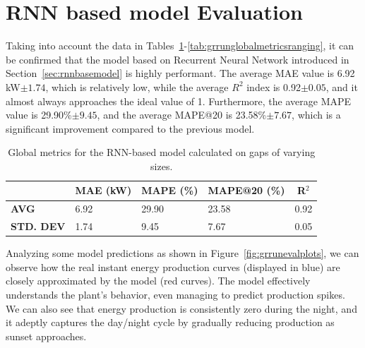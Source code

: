 
\section{RNN based model Evaluation}\label{sec:rnneval}
Taking into account the data in Tables~\ref{tab:grrunglobalmetrics}-\ref{tab:grrunglobalmetricsranging}, it can be confirmed that the model based on
Recurrent Neural Network introduced in Section~\ref{sec:rnnbasemodel} is highly performant.
The average MAE value is 6.92 kW$\pm 1.74$, which is relatively low, while the average $R^2$ index is 0.92$\pm 0.05$, and it almost always approaches the ideal value of 1. Furthermore, the average MAPE value is 29.90\%$\pm 9.45$, and the average MAPE@20 is 23.58\%$\pm7.67$, which is a significant improvement compared to the previous model.

\begin{table}[H]
	\centering
	\begin{tabular}{l|l|l|l|l}
		                                           &
		\multicolumn{1}{c|}{\textbf{MAE (kW)}}     &
		\multicolumn{1}{c|}{\textbf{MAPE (\%)}}    &
		\multicolumn{1}{c|}{\textbf{MAPE@20 (\%)}} &
		\multicolumn{1}{c}{\textbf{R$^2$}}                                       \\
		\hline
		\textbf{AVG}                               & 6.92 & 29.90 & 23.58 & 0.92 \\
		\textbf{STD. DEV}                          & 1.74 & 9.45  & 7.67  & 0.05
	\end{tabular}
	\caption{Global metrics for the RNN-based model calculated on gaps of varying sizes.}
	\label{tab:grrunglobalmetrics}
\end{table}

Analyzing some model predictions as shown in
Figure~\ref{fig:grrunevalplots}, we can observe how the real
instant energy production curves (displayed in blue) are
closely approximated by the model (red curves).
The model effectively understands the plant's behavior,
even managing to predict production spikes.
We can also see that energy production is consistently zero during
the night, and it adeptly captures the
day/night cycle by gradually reducing production as sunset approaches.



